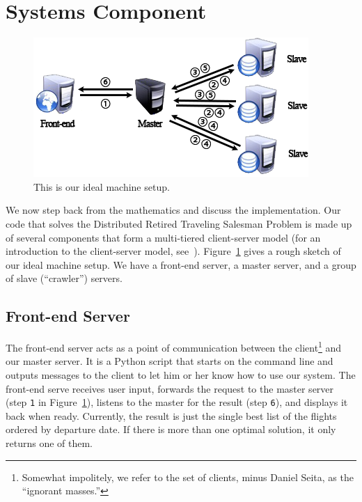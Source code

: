 \documentclass{article}
\begin{document}
\section{Systems Component}\label{sec:systems}

\begin{figure}[t]
\vskip 0.2in
\begin{center}
\centerline{\includegraphics[width=\columnwidth]{servers}}
\caption{This is our ideal machine setup.}
\label{fig:machines}
\end{center}
\vskip -0.2in
\end{figure}

We now step back from the mathematics and discuss the implementation. Our code that solves the Distributed Retired Traveling Salesman Problem is
made up of several components that form a multi-tiered client-server model (for an introduction to the client-server model,
see~\cite{Tanenbaum:2006:DSP:1202502}). Figure~\ref{fig:machines} gives a rough sketch of our ideal machine setup. We have a front-end server, a
master server, and a group of slave (``crawler'') servers.  

\subsection{Front-end Server}\label{sec:front_end_server}

The front-end server acts as a point of communication between the client\footnote{Somewhat impolitely, we refer to the set of clients, minus Daniel
Seita, as the ``ignorant masses.''} and our master server. It is a Python script that starts on the command line and outputs messages to the client
to let him or her know how to use our system. The front-end serve receives user input, forwards the request to the master server (step \texttt{1} in
Figure~\ref{fig:machines}), listens to the master for the result (step \texttt{6}), and displays it back when ready. Currently, the result is just the
single best list of the flights ordered by departure date. If there is more than one optimal solution, it only returns one of them.
\end{document}
